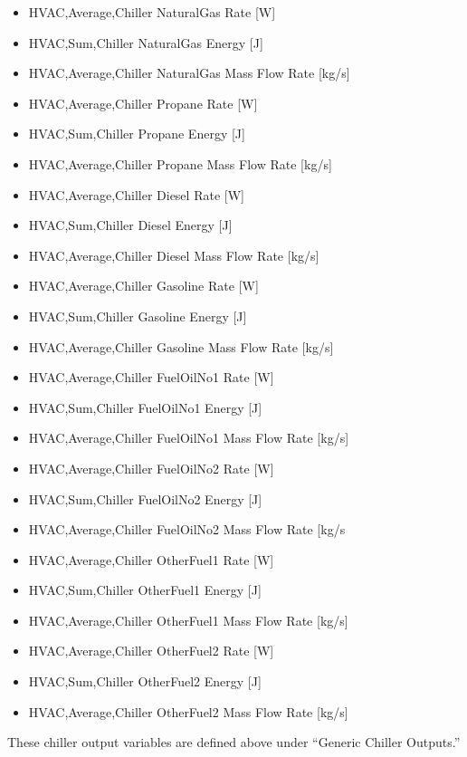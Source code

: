 \begin{itemize}
    \item
    HVAC,Average,Chiller NaturalGas Rate {[}W{]}
    \item
    HVAC,Sum,Chiller NaturalGas Energy {[}J{]}
    \item
    HVAC,Average,Chiller NaturalGas Mass Flow Rate {[}kg/s{]}
    \item
    HVAC,Average,Chiller Propane Rate {[}W{]}
    \item
    HVAC,Sum,Chiller Propane Energy {[}J{]}
    \item
    HVAC,Average,Chiller Propane Mass Flow Rate {[}kg/s{]}
    \item
    HVAC,Average,Chiller Diesel Rate {[}W{]}
    \item
    HVAC,Sum,Chiller Diesel Energy {[}J{]}
    \item
    HVAC,Average,Chiller Diesel Mass Flow Rate {[}kg/s{]}
    \item
    HVAC,Average,Chiller Gasoline Rate {[}W{]}
    \item
    HVAC,Sum,Chiller Gasoline Energy {[}J{]}
    \item
    HVAC,Average,Chiller Gasoline Mass Flow Rate {[}kg/s{]}
    \item
    HVAC,Average,Chiller FuelOilNo1 Rate {[}W{]}
    \item
    HVAC,Sum,Chiller FuelOilNo1 Energy {[}J{]}
    \item
    HVAC,Average,Chiller FuelOilNo1 Mass Flow Rate {[}kg/s{]}
    \item
    HVAC,Average,Chiller FuelOilNo2 Rate {[}W{]}
    \item
    HVAC,Sum,Chiller FuelOilNo2 Energy {[}J{]}
    \item
    HVAC,Average,Chiller FuelOilNo2 Mass Flow Rate {[}kg/s
    \item
    HVAC,Average,Chiller OtherFuel1 Rate {[}W{]}
    \item
    HVAC,Sum,Chiller OtherFuel1 Energy {[}J{]}
    \item
    HVAC,Average,Chiller OtherFuel1 Mass Flow Rate {[}kg/s{]}
    \item
    HVAC,Average,Chiller OtherFuel2 Rate {[}W{]}
    \item
    HVAC,Sum,Chiller OtherFuel2 Energy {[}J{]}
    \item
    HVAC,Average,Chiller OtherFuel2 Mass Flow Rate {[}kg/s{]}
\end{itemize}

These chiller output variables are defined above under ``Generic Chiller Outputs.''

